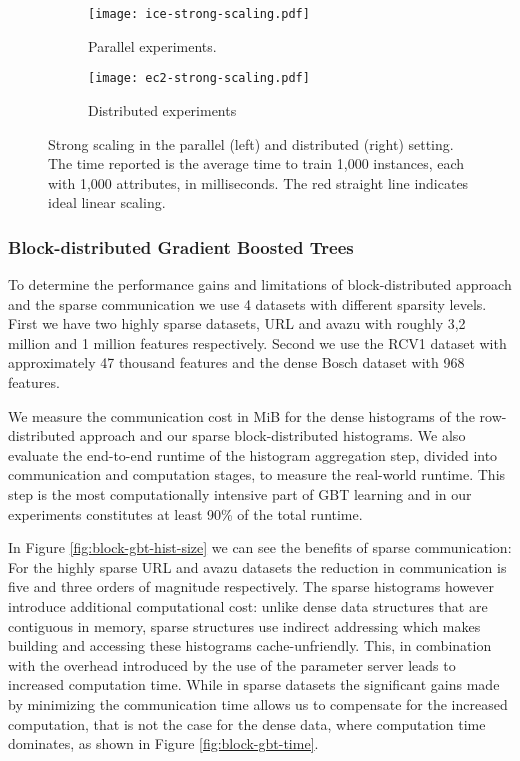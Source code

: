 \begin{figure}
	\centering
	\begin{subfigure}[t]{0.5\textwidth}
		\centering
		\texttt{[image: ice-strong-scaling.pdf]}
		\caption{Parallel experiments.}
		\label{fig:strong-parallel}
	\end{subfigure}%
	\begin{subfigure}[t]{0.5\textwidth}
		\centering
		\texttt{[image: ec2-strong-scaling.pdf]}
		\caption{Distributed experiments}
		\label{fig:strong-distributed}
	\end{subfigure}
	\caption{Strong scaling in the parallel (left) and distributed (right) setting. The
		time reported is the average time to train 1,000 instances, each with 1,000 attributes, in milliseconds. The red straight line indicates ideal linear scaling.}
	\label{fig:strong-scaling}
\end{figure}

\subsubsection*{Block-distributed Gradient Boosted Trees}
\label{sec:block-gbt-results}

To determine the performance gains and limitations of block-distributed approach and
the sparse communication we use 4 datasets with different sparsity levels. First
we have two highly sparse datasets, URL and avazu with roughly 3,2 million and
1 million features respectively. Second we use the RCV1 dataset with approximately
47 thousand features and the dense Bosch dataset with 968 features. 

We measure the
communication cost in MiB for the dense histograms of the row-distributed approach
and our sparse block-distributed histograms. We also evaluate the end-to-end runtime
of the histogram aggregation step, divided into communication and computation stages,
to measure the real-world runtime. This step is the most computationally intensive
part of GBT learning \cite{comm-efficient-gbt} and in our experiments constitutes
at least 90\% of the total runtime.

In Figure \ref{fig:block-gbt-hist-size} we can see the benefits of sparse communication:
For the highly sparse URL and avazu datasets the reduction in communication is five and three orders of magnitude respectively. The sparse histograms however introduce additional computational
cost: unlike dense data structures that are contiguous in memory, sparse structures use
indirect addressing which makes building and accessing these histograms cache-unfriendly.
This, in combination with the overhead introduced by the use of the parameter server
leads to increased computation time.
While in sparse datasets the significant gains made by minimizing the communication time
allows us to compensate for the increased computation, that is not the case for
the dense data, where computation time dominates, as shown in Figure \ref{fig:block-gbt-time}.


